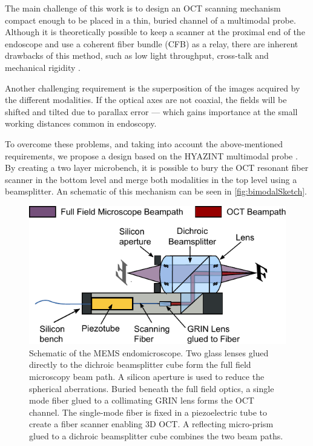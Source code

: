 The main challenge of this work is to design an OCT scanning mechanism compact enough to be placed in a thin, buried channel of a multimodal probe.  Although it is theoretically possible to keep a scanner at the proximal end of the endoscope and use a coherent fiber bundle (CFB) as a relay, there are inherent drawbacks of this method, such as low light throughput, cross-talk and mechanical rigidity \cite{Ford2009}. 

Another challenging requirement is the superposition of the images acquired by the different modalities. If the optical axes are not coaxial, the fields will be shifted and tilted due to parallax error --- which gains importance at the small working distances common in endoscopy.

To overcome these problems, and taking into account the above-mentioned requirements, we propose a design based on the HYAZINT multimodal probe \cite{Kretschmer}. By creating a two layer microbench, it is possible to bury the OCT resonant fiber scanner in the bottom level and merge both modalities in the top level using a beamsplitter. An schematic of this mechanism can be seen in \autoref{fig:bimodalSketch}.

\begin{figure}[h!]\centering
      \includegraphics{figures/30_DesignSimulation/Overview/Schematic_paper.pdf}
      \caption{Schematic of the MEMS endomicroscope. Two glass lenses glued directly to the dichroic beamsplitter cube form the full field microscopy beam path. A silicon aperture is used to reduce the spherical aberrations. Buried beneath the full field optics, a single mode fiber glued to a collimating GRIN lens forms the OCT channel. The single-mode fiber is fixed in a piezoelectric tube to create a fiber scanner enabling 3D OCT. A reflecting micro-prism glued to a dichroic beamsplitter cube combines the two beam paths.}
      \label{fig:bimodalSketch}
\end{figure}

